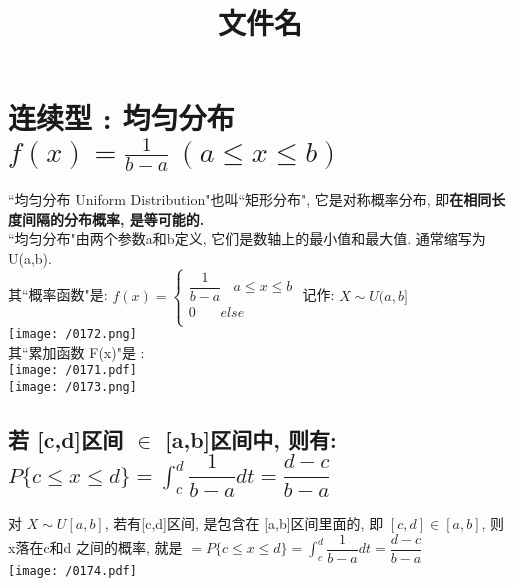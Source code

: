 \documentclass[UTF8]{ctexart}
\title{文件名}
\begin{document}
	\tableofcontents %
	\date{} %
	\maketitle  %
	
	\section{连续型 : 均匀分布 $f(x)=\frac{1}{b-a}\ (a\leq x\leq b)	$ }
	
	``均匀分布 Uniform Distribution"也叫``矩形分布", 它是对称概率分布, 即\textbf{在相同长度间隔的分布概率, 是等可能的.} \\
	
	``均匀分布"由两个参数a和b定义, 它们是数轴上的最小值和最大值. 通常缩写为 U(a,b). \\
	
	其``概率函数"是: 
		$	f\left( x \right) =\left\{ \begin{array}{l}
		\dfrac{1}{b-a}\ \ \ \ a\leq x\leq b\\
		0\ \ \ \ \ \  \ \ else\\
	\end{array} \right. 	$ 
	记作: $X \sim U(a,b]$ \\
	
	\texttt{[image: /0172.png]} \\
	
	其``累加函数 F(x)"是 : \\
	\texttt{[image: /0171.pdf]} \\

	\texttt{[image: /0173.png]} \\
	
	
	
	
	
	
	\subsection{若 [c,d]区间 $\in$ [a,b]区间中, 则有: $ 
		 P\{c \leq x \leq d\} = \int_c^d \dfrac{1} {b-a} dt = \dfrac{d-c} {b-a}$}
	
	对 $X \sim U[a,b]$, 若有[c,d]区间, 是包含在 [a,b]区间里面的, 即 $ [c,d] \in [a,b]$, 则 x落在c和d 之间的概率, 就是 $= P\{c \leq x \leq d\} = \int_c^d \dfrac{1} {b-a} dt = \dfrac{d-c} {b-a}$ \\
	
	\texttt{[image: /0174.pdf]} \\
	
\end{document}
